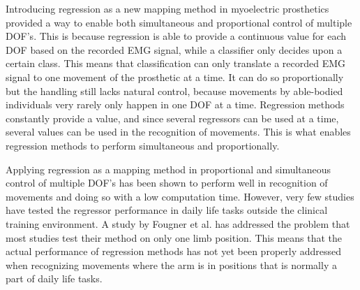 Introducing regression as a new mapping method in myoelectric prosthetics provided a way to enable both simultaneous and proportional control of multiple DOF's. This is because regression is able to provide a continuous value for each DOF based on the recorded EMG signal, while a classifier only decides upon a certain class.%
This means that classification can only translate a recorded EMG signal to one movement of the prosthetic at a time. It can do so proportionally but the handling still lacks natural control, because movements by able-bodied individuals very rarely only happen in one DOF at a time. Regression methods constantly provide a value, and since several regressors can be used at a time, several values can be used in the recognition of movements. This is what enables regression methods to perform simultaneous and proportionally. 


Applying regression as a mapping method in proportional and simultaneous control of multiple DOF's has been shown to perform well in recognition of movements and doing so with a low computation time. \cite{hahne2014} However, very few studies have tested the regressor performance in daily life tasks outside the clinical training environment. \cite{jiang2012} A study by Fougner et al. \cite{Fougner2011} has addressed the problem that most studies test their method on only one limb position. This means that the actual performance of regression methods has not yet been properly addressed when recognizing movements where the arm is in positions that is normally a part of daily life tasks. 

